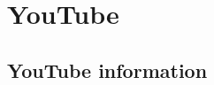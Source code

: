 \documentclass{article}
\begin{document}

\section{YouTube}

\subsection{YouTube information}
\end{document}

